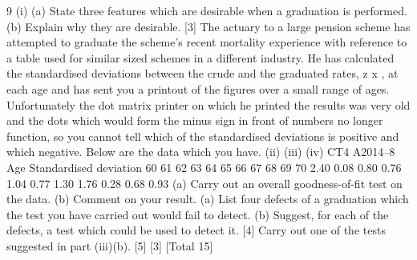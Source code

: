\documentclass[a4paper,12pt]{article}
\begin{document}
\begin{enumerate}
9
(i)
(a) State three features which are desirable when a graduation is
performed.
(b) Explain why they are desirable.
[3]
The actuary to a large pension scheme has attempted to graduate the scheme’s recent
mortality experience with reference to a table used for similar sized schemes in a
different industry. He has calculated the standardised deviations between the crude
and the graduated rates, z x , at each age and has sent you a printout of the figures over
a small range of ages. Unfortunately the dot matrix printer on which he printed the
results was very old and the dots which would form the minus sign in front of
numbers no longer function, so you cannot tell which of the standardised deviations is
positive and which negative. Below are the data which you have.
(ii)
(iii)
(iv)
CT4 A2014–8
Age Standardised
deviation
60
61
62
63
64
65
66
67
68
69
70 2.40
0.08
0.80
0.76
1.04
0.77
1.30
1.76
0.28
0.68
0.93
(a) Carry out an overall goodness-of-fit test on the data.
(b) Comment on your result.
(a) List four defects of a graduation which the test you have carried out
would fail to detect.
(b) Suggest, for each of the defects, a test which could be used to detect it.
[4]
Carry out one of the tests suggested in part (iii)(b).
[5]
[3]
[Total 15]


\end{enumerate}
\end{document}
